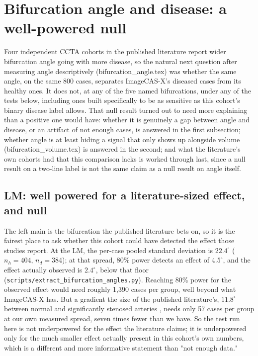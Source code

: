 
\section*{Bifurcation angle and disease: a well-powered null}

Four independent CCTA cohorts in the published literature report wider bifurcation angle going with
more disease, so the natural next question after measuring angle descriptively
(bifurcation\_angle.tex) was whether the same angle, on the same 800 cases, separates
ImageCAS-X's diseased cases from its healthy ones. It does not, at any of the five named
bifurcations, under any of the tests below, including ones built specifically to be as sensitive as
this cohort's binary disease label allows. That null result turned out to need more explaining than
a positive one would have: whether it is genuinely a gap between angle and disease, or an artifact
of not enough cases, is answered in the first subsection; whether angle is at least hiding a signal
that only shows up alongside volume (bifurcation\_volume.tex) is answered in the second; and what
the literature's own cohorts had that this comparison lacks is worked through last, since a null
result on a two-line label is not the same claim as a null result on angle itself.

\subsection*{LM: well powered for a literature-sized effect, and null}

The left main is the bifurcation the published literature bets on, so it is the fairest place to
ask whether this cohort could have detected the effect those studies report. At the LM, the
per-case pooled standard deviation is $22.4^\circ$ ($n_h = 404$, $n_d = 384$); at that spread, 80\%
power detects an effect of $4.5^\circ$, and the effect actually observed is $2.4^\circ$, below that
floor (\texttt{scripts/extract\_bifurcation\_angles.py}). Reaching 80\% power for the observed
effect would need roughly 1,390 cases per group, well beyond what ImageCAS-X has. But a gradient the
size of the published literature's, $11.8^\circ$ between normal and significantly stenosed arteries
\cite{juan2017bifurcation}, needs only 57 cases per group at our own measured spread, seven times
fewer than we have. So the test run here is not underpowered for the effect the literature claims;
it is underpowered only for the much smaller effect actually present in this cohort's own numbers,
which is a different and more informative statement than "not enough data."

